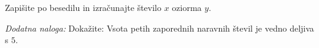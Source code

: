 \documentclass[addpoints]{exam}
\begin{document}
\begin{questions}
    


    \question
    Zapišite po besedilu in izračunajte število $x$ oziorma $y$.
    
    \begin{solution}[3cm]

    \end{solution}

        




     \newpage

    \bonusquestion[3]
    \textit{Dodatna naloga:} Dokažite: Vsota petih zaporednih naravnih števil je vedno deljiva s $5$.

    \begin{solution}[7cm]

    \end{solution}




\end{questions}
\end{document}
